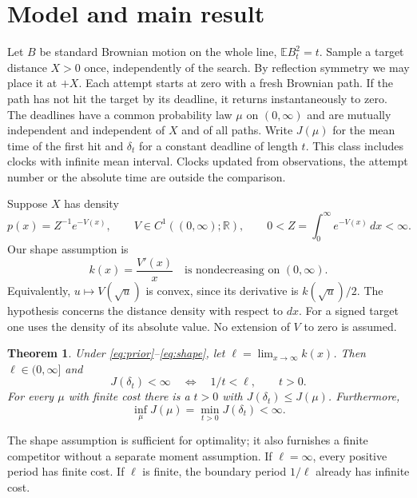 \documentclass[11pt]{article}
\newtheorem{theorem}{Theorem}
\newcommand{\E}{\mathbb E}
\begin{document}
\section{Model and main result}
Let $B$ be standard Brownian motion on the whole line, $\E B_t^2=t$.
Sample a target distance $X>0$ once, independently of the search. By
reflection symmetry we may place it at $+X$. Each attempt starts at zero
with a fresh Brownian path. If the path has not hit the target by its
deadline, it returns instantaneously to zero. The deadlines have a common
probability law $\mu$ on $(0,\infty)$ and are mutually independent and
independent of $X$ and of all paths. Write $J(\mu)$ for the mean time
of the first hit and $\delta_t$ for a constant deadline of length $t$.
This class includes clocks with infinite mean interval. Clocks updated
from observations, the attempt number or the absolute time are outside
the comparison.

Suppose $X$ has density
\begin{equation}\label{eq:prior}
 p(x)=Z^{-1}e^{-V(x)},\qquad
 V\in C^1((0,\infty);\mathbb R),\qquad
 0<Z=\int_0^\infty e^{-V(x)}\,dx<\infty .
\end{equation}
Our shape assumption is
\begin{equation}\label{eq:shape}
 k(x)=\frac{V'(x)}{x}\quad\text{is nondecreasing on }(0,\infty).
\end{equation}
Equivalently, $u\mapsto V(\sqrt u)$ is convex, since its derivative is
$k(\sqrt u)/2$. The hypothesis concerns the distance density with respect
to $dx$. For a signed target one uses the density of its absolute value.
No extension of $V$ to zero is assumed.

\begin{theorem}\label{th:main}
Under \eqref{eq:prior}--\eqref{eq:shape}, let
$\ell=\lim_{x\to\infty} k(x)$. Then $\ell\in(0,\infty]$ and
\begin{equation}\label{eq:finite}
 J(\delta_t)<\infty \quad\Longleftrightarrow\quad 1/t<\ell,\qquad t>0 .
\end{equation}
For every $\mu$ with finite cost there is a $t>0$ with
$J(\delta_t)\le J(\mu)$. Furthermore,
\[
       \inf_{\mu}J(\mu)=\min_{t>0}J(\delta_t)<\infty .
\]
\end{theorem}

The shape assumption is sufficient for optimality; it also furnishes a
finite competitor without a separate moment assumption. If $\ell=\infty$,
every positive period has finite cost. If $\ell$ is finite, the boundary
period $1/\ell$ already has infinite cost.
\end{document}
